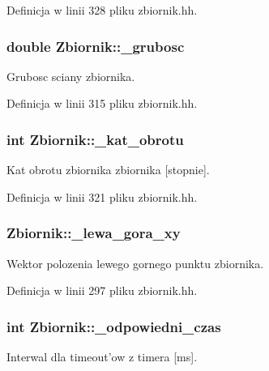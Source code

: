 Definicja w linii 328 pliku zbiornik.\-hh.

\hypertarget{class_zbiornik_a8a1db6d1edbfaa1a4f84d9717a8c0dfc}{
\subsubsection[{\-\_\-grubosc}]{\setlength{\rightskip}{0pt plus 5cm}double Zbiornik\-::\-\_\-grubosc\hspace{0.3cm}{\ttfamily [private]}}}\label{class_zbiornik_a8a1db6d1edbfaa1a4f84d9717a8c0dfc}
Grubosc sciany zbiornika. 

Definicja w linii 315 pliku zbiornik.\-hh.

\hypertarget{class_zbiornik_a0ec6f5babd42c79bf3f1e7055e8d413e}{
\subsubsection[{\-\_\-kat\-\_\-obrotu}]{\setlength{\rightskip}{0pt plus 5cm}int Zbiornik\-::\-\_\-kat\-\_\-obrotu\hspace{0.3cm}{\ttfamily [private]}}}\label{class_zbiornik_a0ec6f5babd42c79bf3f1e7055e8d413e}
Kat obrotu zbiornika zbiornika \mbox{[}stopnie\mbox{]}. 

Definicja w linii 321 pliku zbiornik.\-hh.

\hypertarget{class_zbiornik_aab83049b3afbd20e1f158daf16e17e87}{
\subsubsection[{\-\_\-lewa\-\_\-gora\-\_\-xy}]{ Zbiornik\-::\-\_\-lewa\-\_\-gora\-\_\-xy\hspace{0.3cm}{\ttfamily [private]}}}\label{class_zbiornik_aab83049b3afbd20e1f158daf16e17e87}
Wektor polozenia lewego gornego punktu zbiornika. 

Definicja w linii 297 pliku zbiornik.\-hh.

\hypertarget{class_zbiornik_a14cf0ec861fc38fe40081342ef1e00df}{
\subsubsection[{\-\_\-odpowiedni\-\_\-czas}]{\setlength{\rightskip}{0pt plus 5cm}int Zbiornik\-::\-\_\-odpowiedni\-\_\-czas\hspace{0.3cm}{\ttfamily [private]}}}\label{class_zbiornik_a14cf0ec861fc38fe40081342ef1e00df}
Interwal dla timeout'ow z timera \mbox{[}ms\mbox{]}. 

